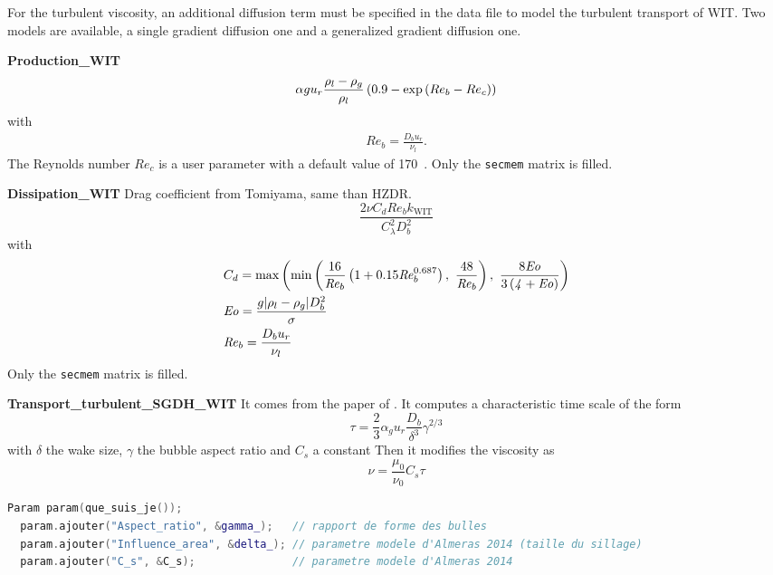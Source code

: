For the turbulent viscosity, an additional diffusion term must be specified in the data file to model the turbulent transport of WIT. Two models are available, a single gradient diffusion one and a generalized gradient diffusion one.



\textbf{Production_WIT}
\begin{equation}
    \alpha{}g u_r\frac{\rho_l - \rho_g}{\rho_l}\left( 0.9 - \exp\left( Re_b-Re_c \right) \right)
\end{equation}
with
\begin{align}
    \mathit{Re}_b = \frac{D_b u_r}{\nu_l}.
\end{align}
The Reynolds number $\mathit{Re}_c$ is a user parameter with a default value of 170~\cite{DuCluzeau2019}. Only the \texttt{secmem} matrix is filled.



\textbf{Dissipation_WIT}
Drag coefficient from Tomiyama, same than HZDR.
\begin{equation}
    \frac{2\nu C_d \mathit{Re}_b k_{\text{WIT}}}{C_{\lambda}^2 D_b^2}
\end{equation}
with
\begin{align}
    &C_d = \max\parent{\min\parent{\frac{16}{\mathit{Re}_b}\parent{1+0.15\mathit{Re}_b^{0.687}},\ \frac{48}{\mathit{Re}_b}},\ \frac{8\mathit{Eo}}{3\parent{\mathit{4+Eo}}}}\\
    &\mathit{Eo} = \frac{g\norm{\rho_l - \rho_g}D_b^2}{\sigma}\\
    &\mathit{Re}_b = \frac{D_b u_r}{\nu_l}
\end{align}
 Only the \texttt{secmem} matrix is filled.



\textbf{Transport_turbulent_SGDH_WIT}
It comes from the paper of \cite{Almeras2014}.
It computes a characteristic time scale of the form
\begin{equation}
    \tau = \frac{2}{3} \alpha_g u_r \frac{D_b}{\delta^3} \gamma^{2/3}
\end{equation}
with $\delta$ the wake size, $\gamma$ the bubble aspect ratio and $C_s$ a constant
Then it modifies the viscosity as
\begin{equation}
    \nu = \frac{\mu_0}{\nu_0}C_s \tau
\end{equation}

\begin{lstlisting}[language=c++]
  Param param(que_suis_je());
  param.ajouter("Aspect_ratio", &gamma_);   // rapport de forme des bulles
  param.ajouter("Influence_area", &delta_); // parametre modele d'Almeras 2014 (taille du sillage)
  param.ajouter("C_s", &C_s);               // parametre modele d'Almeras 2014
\end{lstlisting}



